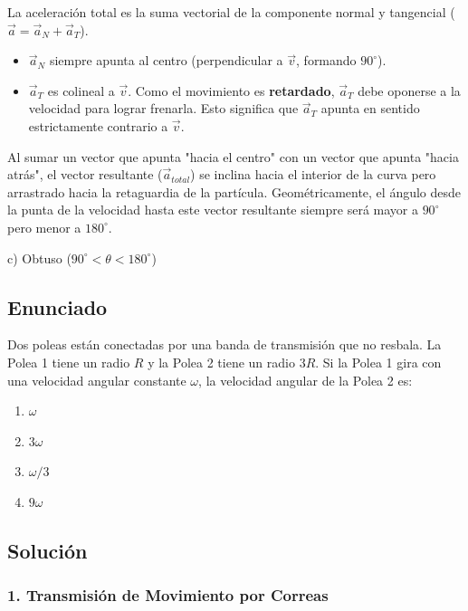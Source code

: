 \documentclass[12pt, a4paper]{article}
\begin{document}
La aceleración total es la suma vectorial de la componente normal y tangencial ($\vec{a} = \vec{a}_N + \vec{a}_T$).
\begin{itemize}
    \item $\vec{a}_N$ siempre apunta al centro (perpendicular a $\vec{v}$, formando $90^\circ$).
    \item $\vec{a}_T$ es colineal a $\vec{v}$. Como el movimiento es \textbf{retardado}, $\vec{a}_T$ debe oponerse a la velocidad para lograr frenarla. Esto significa que $\vec{a}_T$ apunta en sentido estrictamente contrario a $\vec{v}$.
\end{itemize}
Al sumar un vector que apunta "hacia el centro" con un vector que apunta "hacia atrás", el vector resultante ($\vec{a}_{total}$) se inclina hacia el interior de la curva pero arrastrado hacia la retaguardia de la partícula. Geométricamente, el ángulo desde la punta de la velocidad hasta este vector resultante siempre será mayor a $90^\circ$ pero menor a $180^\circ$.

\begin{tcolorbox}[colback=green!5!white, colframe=green!50!black, title=Respuesta Final]
\centering \Large c) Obtuso ($90^\circ < \theta < 180^\circ$)
\end{tcolorbox}

\newpage

\subsection*{Enunciado}
Dos poleas están conectadas por una banda de transmisión que no resbala. La Polea 1 tiene un radio $R$ y la Polea 2 tiene un radio $3R$. Si la Polea 1 gira con una velocidad angular constante $\omega$, la velocidad angular de la Polea 2 es:
\begin{enumerate}[label=\alph*)]
    \item $\omega$
    \item $3\omega$
    \item $\omega / 3$
    \item $9\omega$
\end{enumerate}

\subsection*{Solución}

\subsubsection*{1. Transmisión de Movimiento por Correas}
\end{document}

